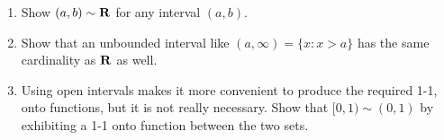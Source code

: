 \documentclass{lew98_solutions}
\begin{document}
\begin{exercise}
\label{ex:1.5.4}
    \begin{enumerate}
        \item Show \( (a, b) \sim \mathbf{R} \) for any interval \( (a, b) \).

        \item Show that an unbounded interval like \( (a, \infty) = \{ x : x > a \} \) has the same cardinality as \( \mathbf{R} \) as well.

        \item Using open intervals makes it more convenient to produce the required 1-1, onto functions, but it is not really necessary. Show that \( [0, 1) \sim (0, 1) \) by exhibiting a 1-1 onto function between the two sets.
    \end{enumerate}
\end{exercise}
\end{document}

